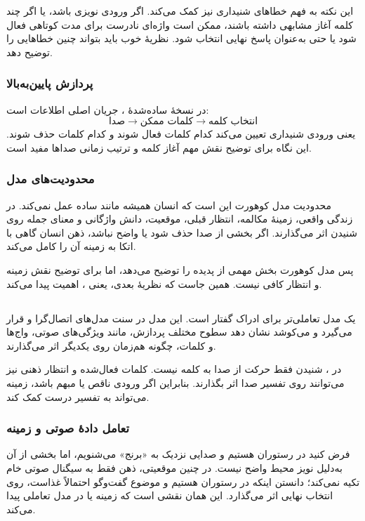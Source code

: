 این نکته به فهم خطاهای شنیداری نیز کمک می‌کند. اگر ورودی نویزی باشد، یا اگر چند کلمه آغاز مشابهی داشته باشند، ممکن است واژه‌ای نادرست برای مدت کوتاهی فعال شود یا حتی به‌عنوان پاسخ نهایی انتخاب شود. نظریهٔ خوب باید بتواند چنین خطاهایی را توضیح دهد.

\subsubsection{پردازش پایین‌به‌بالا}
در نسخهٔ ساده‌شدهٔ ، جریان اصلی اطلاعات  است:
\[
\text{صدا} \rightarrow \text{کلمات ممکن} \rightarrow \text{انتخاب کلمه}
\]
یعنی ورودی شنیداری تعیین می‌کند کدام کلمات فعال شوند و کدام کلمات حذف شوند. این نگاه برای توضیح نقش مهم آغاز کلمه و ترتیب زمانی صداها مفید است.

\subsubsection{محدودیت‌های مدل}
محدودیت مدل کوهورت این است که انسان همیشه مانند  ساده عمل نمی‌کند. در زندگی واقعی، زمینهٔ مکالمه، انتظار قبلی، موقعیت، دانش واژگانی و معنای جمله روی شنیدن اثر می‌گذارند. اگر بخشی از صدا حذف شود یا واضح نباشد، ذهن انسان گاهی با اتکا به زمینه آن را کامل می‌کند.

پس مدل کوهورت بخش مهمی از پدیده را توضیح می‌دهد، اما برای توضیح نقش زمینه و انتظار کافی نیست. همین جاست که نظریهٔ بعدی، یعنی ، اهمیت پیدا می‌کند.

\subsection{}
 یک مدل تعاملی‌تر برای ادراک گفتار است. این مدل در سنت مدل‌های اتصال‌گرا و  قرار می‌گیرد و می‌کوشد نشان دهد سطوح مختلف پردازش، مانند ویژگی‌های صوتی، واج‌ها و کلمات، چگونه هم‌زمان روی یکدیگر اثر می‌گذارند.

در ، شنیدن فقط حرکت از صدا به کلمه نیست. کلمات فعال‌شده و انتظار ذهنی نیز می‌توانند روی تفسیر صدا اثر بگذارند. بنابراین اگر ورودی ناقص یا مبهم باشد، زمینه می‌تواند به تفسیر درست کمک کند.

\subsubsection{تعامل دادهٔ صوتی و زمینه}
فرض کنید در رستوران هستیم و صدایی نزدیک به «برنج» می‌شنویم، اما بخشی از آن به‌دلیل نویز محیط واضح نیست. در چنین موقعیتی، ذهن فقط به سیگنال صوتی خام تکیه نمی‌کند؛ دانستن اینکه در رستوران هستیم و موضوع گفت‌وگو احتمالاً غذاست، روی انتخاب نهایی اثر می‌گذارد. این همان نقشی است که زمینه یا  در مدل تعاملی پیدا می‌کند.

